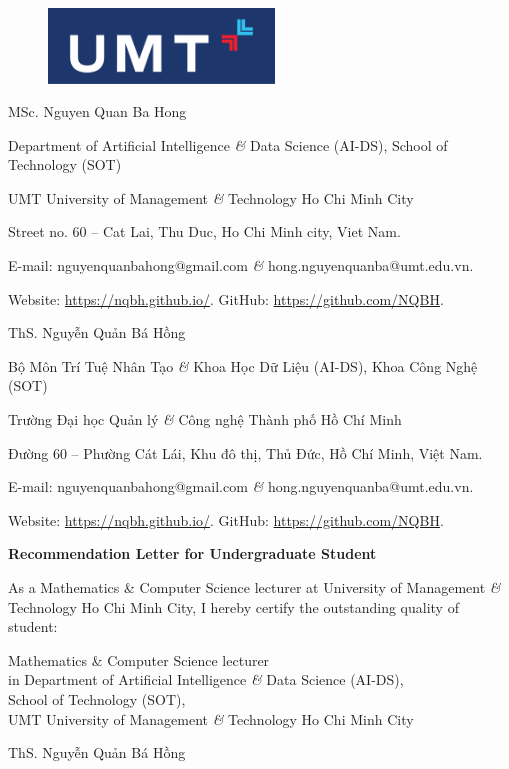 \documentclass[11pt]{article}
\begin{document}
\begin{figure}[H]
    \includegraphics[width=6cm]{UMT_logo}
\end{figure}

\begin{flushleft}
     MSc. {\sc Nguyen Quan Ba Hong}
     
     Department of Artificial Intelligence {\it\&} Data Science (AI-DS), School of Technology (SOT)
     
     UMT University of Management {\it\&} Technology Ho Chi Minh City
     
     Street no. 60 -- Cat Lai, Thu Duc, Ho Chi Minh city, Viet Nam.
     
     E-mail: {\sf nguyenquanbahong@gmail.com} {\it\&} {\sf hong.nguyenquanba@umt.edu.vn}.
     
     Website: \url{https://nqbh.github.io/}. GitHub: \url{https://github.com/NQBH}.
\end{flushleft}

\begin{flushright}
    ThS. {\sc Nguyễn Quản Bá Hồng}
    
    Bộ Môn Trí Tuệ Nhân Tạo {\it\&} Khoa Học Dữ Liệu (AI-DS), Khoa Công Nghệ (SOT)
    
    Trường Đại học Quản lý {\it\&} Công nghệ Thành phố Hồ Chí Minh
    
    Đường 60 -- Phường Cát Lái, Khu đô thị, Thủ Đức, Hồ Chí Minh, Việt Nam.
    
    E-mail: {\sf nguyenquanbahong@gmail.com} {\it\&} {\sf hong.nguyenquanba@umt.edu.vn}.
    
    Website: \url{https://nqbh.github.io/}. GitHub: \url{https://github.com/NQBH}.
\end{flushright}
\vspace{5mm}
\begin{center}
    \LARGE
    \textbf{\textsf{Recommendation Letter for Undergraduate Student}}
\end{center}
As a Mathematics \& Computer Science lecturer at University of Management {\it\&} Technology Ho Chi Minh City, I hereby certify the outstanding quality of student: 




\begin{flushright}    
    Mathematics \& Computer Science lecturer\\in Department of Artificial Intelligence {\it\&} Data Science (AI-DS),\\School of Technology (SOT),\\UMT University of Management {\it\&} Technology Ho Chi Minh City
    
    ThS. {\sc Nguyễn Quản Bá Hồng}
\end{flushright}


\printbibliography[heading=bibintoc]
\end{document}
